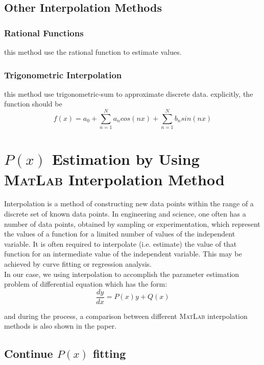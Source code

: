 \documentclass[a4paper]{article}
\begin{document}
\subsection{Other Interpolation Methods}
\subsubsection{Rational Functions}
this method use the rational function to estimate values.
\subsubsection{Trigonometric Interpolation}
this method use trigonometric-sum to approximate discrete data. explicitly, the function should be $$f(x)=a_{0}+\sum_{n=1}^{N}a_{n}cos(nx)+\sum_{n=1}^{N}b_{n}sin(nx)$$


\section{$P(x)$ Estimation by Using \textsc{MatLab} Interpolation Method}


Interpolation is a method of constructing new data points within the range of a discrete set of known data points.
In engineering and science, one often has a number of data points, obtained by sampling or experimentation, which represent the values of a function for a limited number of values of the independent variable. It is often required to interpolate (i.e. estimate) the value of that function for an intermediate value of the independent variable. This may be achieved by curve fitting or regression analysis.\\
In our case, we using interpolation to accomplish the parameter estimation problem of differential equation which has the form:
\begin{equation}
\frac{{dy}}{{dx}} = P(x)y + Q(x)
\end{equation}

and during the process, a comparison between different \textsc{MatLab} interpolation methods is also shown in the paper.

\subsection{Continue $P(x)$ fitting}
\end{document}
